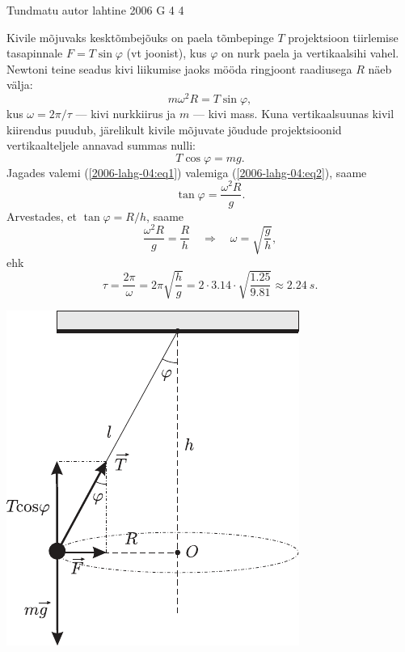 \documentclass[11pt, twoside]{article}
\begin{document}
{%
{Tundmatu autor} %
{lahtine} %
{2006} %
{G 4} %
{4} %
{

\ifSolution
Kivile mõjuvaks kesktõmbejõuks on paela tõmbepinge $T$ projektsioon tiirlemise
tasapinnale $F = T \sin \varphi$ (vt joonist), kus $\varphi$ on nurk paela ja vertikaalsihi vahel. Newtoni teine seadus kivi liikumise jaoks mööda ringjoont raadiusega $R$ näeb välja:
\begin{equation} \label{2006-lahg-04:eq1}
m\omega^2R = T \sin \varphi,
\end{equation}
kus $\omega = 2\pi /\tau$ --- kivi nurkkiirus ja $m$ --- kivi mass. Kuna vertikaalsuunas kivil kiirendus puudub, järelikult kivile mõjuvate jõudude projektsioonid vertikaalteljele annavad summas nulli:
\begin{equation} \label{2006-lahg-04:eq2}
T \cos\varphi = mg.
\end{equation}
Jagades valemi (\ref{2006-lahg-04:eq1}) valemiga (\ref{2006-lahg-04:eq2}), saame
\[
\tan \varphi = \frac{\omega^2R}{g}.
\]
Arvestades, et $\tan \varphi = R/h$, saame
\[
\frac{\omega^{2} R}{g}=\frac{R}{h} \quad \Rightarrow \quad \omega=\sqrt{\frac{g}{h}},
\]
ehk
\[
\tau=\frac{2 \pi}{\omega}=2 \pi \sqrt{\frac{h}{g}}=2 \cdot \num{3,14} \cdot \sqrt{\frac{\num{1,25}}{\num{9,81}}} \approx \SI{2,24}{s}.
\]

\begin{center}
	\includegraphics[width=0.7\linewidth]{2006-lahg-04-lah}
\end{center}
\fi
}

}
\end{document}
